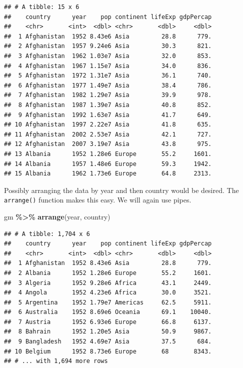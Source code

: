 \documentclass[
]{krantz}
\newenvironment{Shaded}{\begin{snugshade}}{\end{snugshade}}
\newcommand{\KeywordTok}[1]{\textcolor[rgb]{0.13,0.29,0.53}{\textbf{#1}}}
\newcommand{\NormalTok}[1]{#1}
\newcommand{\OperatorTok}[1]{\textcolor[rgb]{0.81,0.36,0.00}{\textbf{#1}}}
\newcommand{\StringTok}[1]{\textcolor[rgb]{0.31,0.60,0.02}{#1}}
\begin{document}
\begin{verbatim}
## # A tibble: 15 x 6
##    country      year    pop continent lifeExp gdpPercap
##    <chr>       <int>  <dbl> <chr>       <dbl>     <dbl>
##  1 Afghanistan  1952 8.43e6 Asia         28.8      779.
##  2 Afghanistan  1957 9.24e6 Asia         30.3      821.
##  3 Afghanistan  1962 1.03e7 Asia         32.0      853.
##  4 Afghanistan  1967 1.15e7 Asia         34.0      836.
##  5 Afghanistan  1972 1.31e7 Asia         36.1      740.
##  6 Afghanistan  1977 1.49e7 Asia         38.4      786.
##  7 Afghanistan  1982 1.29e7 Asia         39.9      978.
##  8 Afghanistan  1987 1.39e7 Asia         40.8      852.
##  9 Afghanistan  1992 1.63e7 Asia         41.7      649.
## 10 Afghanistan  1997 2.22e7 Asia         41.8      635.
## 11 Afghanistan  2002 2.53e7 Asia         42.1      727.
## 12 Afghanistan  2007 3.19e7 Asia         43.8      975.
## 13 Albania      1952 1.28e6 Europe       55.2     1601.
## 14 Albania      1957 1.48e6 Europe       59.3     1942.
## 15 Albania      1962 1.73e6 Europe       64.8     2313.
\end{verbatim}

Possibly arranging the data by year and then country would be desired. The \texttt{arrange()} function makes this easy. We will again use pipes.

\begin{Shaded}
\begin{Highlighting}[]
\NormalTok{gm }\OperatorTok{\%\textgreater{}\%}\StringTok{ }
\StringTok{  }\KeywordTok{arrange}\NormalTok{(year, country)}
\end{Highlighting}
\end{Shaded}

\begin{verbatim}
## # A tibble: 1,704 x 6
##    country      year    pop continent lifeExp gdpPercap
##    <chr>       <int>  <dbl> <chr>       <dbl>     <dbl>
##  1 Afghanistan  1952 8.43e6 Asia         28.8      779.
##  2 Albania      1952 1.28e6 Europe       55.2     1601.
##  3 Algeria      1952 9.28e6 Africa       43.1     2449.
##  4 Angola       1952 4.23e6 Africa       30.0     3521.
##  5 Argentina    1952 1.79e7 Americas     62.5     5911.
##  6 Australia    1952 8.69e6 Oceania      69.1    10040.
##  7 Austria      1952 6.93e6 Europe       66.8     6137.
##  8 Bahrain      1952 1.20e5 Asia         50.9     9867.
##  9 Bangladesh   1952 4.69e7 Asia         37.5      684.
## 10 Belgium      1952 8.73e6 Europe       68       8343.
## # ... with 1,694 more rows
\end{verbatim}
\end{document}
